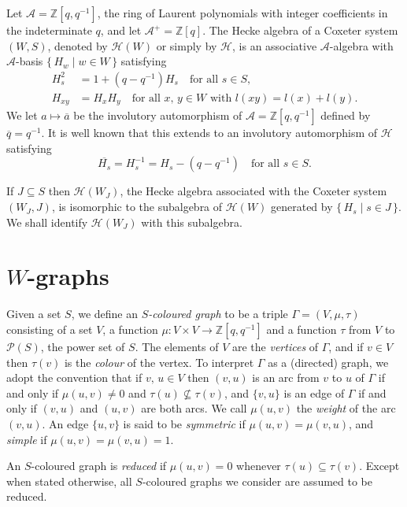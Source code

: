 \documentclass[ALCO,ThmDefs,Unicode,epreuves]{cedram}
\begin{document}
Let $\mathcal{A} = \mathbb{Z}[q, q^{-1}]$, the ring of Laurent
polynomials with integer coefficients in the indeterminate $q$,
and let $\mathcal{A}^{+} = \mathbb{Z}[q]$.
The Hecke algebra of a Coxeter system $(W, S)$, denoted by
$\mathcal{H}(W)$ or simply by $\mathcal{H}$,
is an associative $\mathcal{A}$-algebra with $\mathcal{A}$-basis
$\{\,H_w\mid w\in W\,\}$ satisfying
\begin{align*}
H^{2}_{s} &= 1 + (q -q^{-1})H_{s} \quad \text{for all $s \in S$},\\
H_{xy}&= H_{x}H_{y} \quad
\text{for all $x,\,y \in W$ with $l(xy)=l(x)+l(y)$.}
\end{align*}
We let $a \mapsto \overline{a}$ be the involutory automorphism of
$\mathcal{A}=\mathbb{Z}[q,q^{-1}]$ defined by $\overline{q}=q^{-1}$.
It is well known that this extends to an involutory automorphism of
$\mathcal{H}$ satisfying
\begin{equation*}
\overline{H_{s}} = H_{s}^{-1} = H_{s} - (q - q^{-1}) \quad
\text{for all $s \in S$}.
\end{equation*}

If $J\subseteq S$ then $\mathcal{H}(W_{J})$, the Hecke algebra
associated with the Coxeter system $(W_{J},J)$, is isomorphic to
the subalgebra of $\mathcal{H}(W)$ generated by
$\{\,H_{s} \mid s \in J\,\}$. We shall identify $\mathcal{H}(W_{J})$
with this subalgebra.

\section{\texorpdfstring{$W$}{W}-graphs}
\label{sec:3}

Given a set $S$, we define an \emph{$S$-coloured graph} to be
a triple $\Gamma=(V, \mu, \tau)$ consisting of a set $V\!$, a
function $\mu\colon V \times V\to \mathbb{Z}[q,q^{-1}]$ and a function
$\tau$ from $V$ to $\mathcal{P}(S)$, the power set of $S$.
The elements of $V$ are the \emph{vertices} of $\Gamma$, and if
$v\in V$ then $\tau(v)$ is the \emph{colour} of the vertex.
To interpret $\Gamma$ as a (directed) graph, we adopt the convention that
if $v,\,u\in V$ then $(v,u)$ is an arc from $v$ to $u$ of $\Gamma$
if and only if $\mu(u,v) \neq 0$ and $\tau(u)\nsubseteq\tau(v)$, and
$\{v,u\}$ is an edge of $\Gamma$ if and only if $(v,u)$ and
$(u,v)$ are both arcs. We call $\mu(u,v)$ the \emph{weight}
of the arc~$(v,u)$. An edge $\{u,v\}$ is said to be \emph{symmetric}
if $\mu(u,v)=\mu(v,u)$, and \emph{simple} if $\mu(u,v)=\mu(v,u)=1$.

An $S$-coloured graph is \emph{reduced} if $\mu(u,v)=0$ whenever
$\tau(u)\subseteq\tau(v)$. Except when stated otherwise, all $S$-coloured
graphs we consider are assumed to be reduced.
\end{document}

